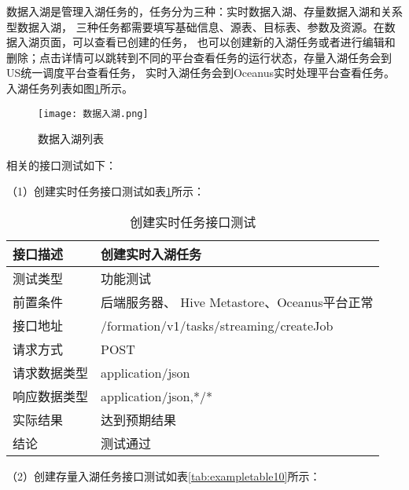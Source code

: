 数据入湖是管理入湖任务的，任务分为三种：实时数据入湖、存量数据入湖和关系型数据入湖，
三种任务都需要填写基础信息、源表、目标表、参数及资源。在数据入湖页面，可以查看已创建的任务，
也可以创建新的入湖任务或者进行编辑和删除；点击详情可以跳转到不同的平台查看任务的运行状态，存量入湖任务会到US统一调度平台查看任务，
实时入湖任务会到Oceanus实时处理平台查看任务。入湖任务列表如图\ref{fig:数据入湖}所示。

\begin{figure}[H]
  \centering
  \texttt{[image: 数据入湖.png]}
  \caption{数据入湖列表}
  \label{fig:数据入湖}
\end{figure}

相关的接口测试如下：

（1）创建实时任务接口测试如表\ref{tab:exampletable9}所示：

\begin{table}[H]
  \centering
  \caption{创建实时任务接口测试}
  \label{tab:exampletable9}
  \begin{tabular}{ll}
    \toprule
    接口描述         & 创建实时入湖任务         \\
    \midrule
    测试类型         & 功能测试         \\
    前置条件         & 后端服务器、 Hive Metastore、Oceanus平台正常         \\
    接口地址          & /formation/v1/tasks/streaming/createJob        \\
    请求方式         & POST      \\
    请求数据类型         & application/json     \\
    响应数据类型         & application/json,*/*           \\
    实际结果         & 达到预期结果           \\
    结论            & 测试通过           \\
    \bottomrule
  \end{tabular}
\end{table}

（2）创建存量入湖任务接口测试如表\ref{tab:exampletable10}所示：

